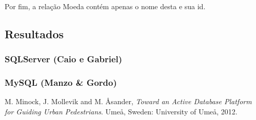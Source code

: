 \documentclass[conference]{IEEEtran}
\begin{document}
    Por fim, a relação Moeda contém apenas o nome desta e sua id.

  \subsection{Resultados}
    \subsubsection{SQLServer (Caio e Gabriel)}
    \subsubsection{MySQL (Manzo \& Gordo)}


\begin{thebibliography}{1}

M. Minock, J. Mollevik and M. \r{A}sander, \textit{Toward an Active Database Platform for Guiding Urban Pedestrians}. Ume\r{a}, Sweden: University of Ume\r{a}, 2012.

\end{thebibliography}
\end{document}
